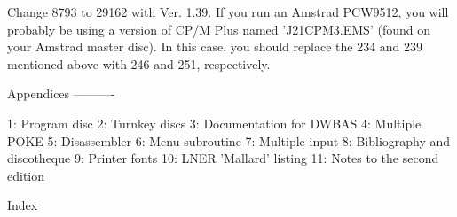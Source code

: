 \documentclass[]{report} %
\begin{document}
Change  8793 to 29162 with Ver. 1.39. If you run an Amstrad PCW9512, you  will 
probably  be using a version of CP/M Plus named 'J21CPM3.EMS' (found  on  your 
Amstrad  master  disc).  In  this case, you should replace  the  234  and  239 
mentioned above with 246 and 251, respectively.



\listoftables
\listoffigures


Appendices
----------

1: Program disc
2: Turnkey discs
3: Documentation for DWBAS
4: Multiple POKE
5: Disassembler
6: Menu subroutine
7: Multiple input
8: Bibliography and discotheque
9: Printer fonts
10: LNER 'Mallard' listing
11: Notes to the second edition


Index
\end{document}

